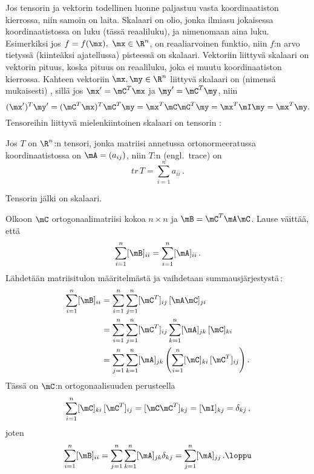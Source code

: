 Jos tensorin ja vektorin todellinen luonne paljastuu vasta koordinaatiston kierrossa, niin 
samoin on  laita. Skalaari on olio, jonka ilmiasu jokaisessa koordinaatistossa
on luku (tässä reaaliluku), ja nimenomaan aina  luku. Esimerkiksi jos 
$f=f(\mx),\ \mx\in\R^n$, on reaaliarvoinen funktio, niin $f$:n  arvo tietyssä 
(kiinteäksi ajatellussa) pisteessä on skalaari. Vektoriin liittyvä skalaari on vektorin pituus,
koska pituus on reaaliluku, joka ei muutu koordinaatiston kierrossa. Kahteen vektoriin 
$\mx,\my\in\R^n$ liittyvä skalaari on (nimensä mukaisesti) , sillä jos 
$\mx'=\mC^T\mx$ ja $\my'=\mC^T\my$, niin
\[
(\mx')^T\my' = (\mC^T\mx)^T\mC^T\my = \mx^T\mC\mC^T\my = \mx^T\mI\my = \mx^T\my.
\]
Tensoreihin liittyvä mielenkiintoinen skalaari on tensorin :
\begin{Def} \label{tensorin jälki} 
Jos $T$ on $\R^n$:n tensori, jonka matriisi annetussa ortonormeeratussa koordinaatistossa on
$\mA=(a_{ij})$, niin $T$:n  (engl.\ trace) on
\[
tr\,T = \sum_{i=1}^n a_{ii}\,.
\]
\end{Def}
\begin{Lause} \label{jälki on skalaari} Tensorin jälki on skalaari. \end{Lause}
\tod Olkoon $\mC$ ortogonaalimatriisi kokoa $n \times n$ ja $\mB=\mC^T\mA\mC$. Lause väittää,
että
\[
\sum_{i=1}^n [\mB]_{ii} = \sum_{i=1}^n [\mA]_ {ii}\,.
\]
Lähdetään matriisitulon määritelmästä ja vaihdetaan summausjärjestystä\,:
\begin{align*}
\sum_{i=1}^n [\mB]_{ii} 
         &= \sum_{i=1}^n\sum_{j=1}^n[\mC^T]_{ij}\,[\mA\mC]_{ji} \\
         &= \sum_{i=1}^n\sum_{j=1}^n[\mC^T]_{ij}\sum_{k=1}^n[\mA]_{jk}\,[\mC]_{ki} \\
         &= \sum_{j=1}^n\sum_{k=1}^n[\mA]_{jk}\left(\sum_{i=1}^n[\mC]_{ki}\,[\mC^T]_{ij}\right).
\end{align*}
Tässä on $\mC$:n ortogonaalisuuden perusteella
\[
\sum_{i=1}^n[\mC]_{ki}\,[\mC^T]_{ij} = [\mC\mC^T]_{kj} = [\mI]_{kj} = \delta_{kj}\,,
\]
joten
\[
\sum_{i=1}^n [\mB]_{ii} = \sum_{j=1}^n\sum_{k=1}^n[\mA]_{jk}\delta_{kj} 
                        = \sum_{j=1}^n[\mA]_{jj}\,. \loppu
\]

